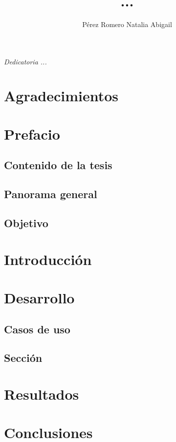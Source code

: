 \documentclass[letterpaper,12pt,oneside]{book}
\author{Pérez Romero Natalia Abigail}
\title{ ...}
\begin{document}
\frontmatter
\maketitle

\chapter*{}
\begin{flushright}%
  \emph{Dedicatoria ...}
  \thispagestyle{empty}
\end{flushright}

\chapter{Agradecimientos}

\tableofcontents

\chapter{Prefacio}

\section*{Contenido de la tesis}
\section*{Panorama general}
\section*{Objetivo}
    
\mainmatter

\chapter{Introducción} %



\chapter{Desarrollo}

\section{Casos de uso}



\section{Sección}
\lipsum[1-2]

\chapter{Resultados}  %

\chapter{Conclusiones}  %


\end{document}
